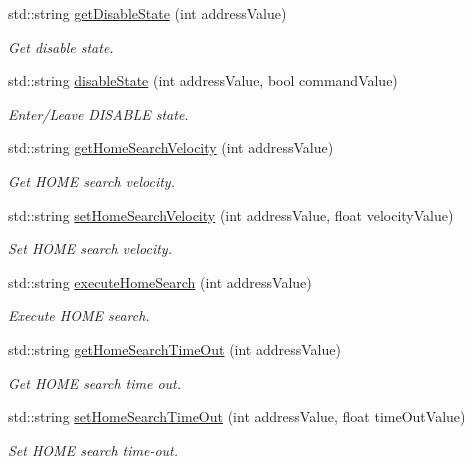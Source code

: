 \begin{DoxyCompactItemize}
std\+::string \hyperlink{namespaceconex_aa030f5f6f8e7d9de0c53bc783fd3b40a}{get\+Disable\+State} (int address\+Value)
\begin{DoxyCompactList}\small\item\em Get disable state. \end{DoxyCompactList}\item 
std\+::string \hyperlink{namespaceconex_a379241e6a2dafd2c5378ff9029a2afbb}{disable\+State} (int address\+Value, bool command\+Value)
\begin{DoxyCompactList}\small\item\em Enter/\+Leave D\+I\+S\+A\+B\+LE state. \end{DoxyCompactList}\item 
std\+::string \hyperlink{namespaceconex_a9bf3d6adb4fd4d48f95b2c27169ef773}{get\+Home\+Search\+Velocity} (int address\+Value)
\begin{DoxyCompactList}\small\item\em Get H\+O\+ME search velocity. \end{DoxyCompactList}\item 
std\+::string \hyperlink{namespaceconex_ae0d284374b70f666fa8cad9bb3c81aa4}{set\+Home\+Search\+Velocity} (int address\+Value, float velocity\+Value)
\begin{DoxyCompactList}\small\item\em Set H\+O\+ME search velocity. \end{DoxyCompactList}\item 
std\+::string \hyperlink{namespaceconex_a31e52a12a8f66df0c10a49931f7fce47}{execute\+Home\+Search} (int address\+Value)
\begin{DoxyCompactList}\small\item\em Execute H\+O\+ME search. \end{DoxyCompactList}\item 
std\+::string \hyperlink{namespaceconex_a5652c22cdfb236799111449461eb88f5}{get\+Home\+Search\+Time\+Out} (int address\+Value)
\begin{DoxyCompactList}\small\item\em Get H\+O\+ME search time out. \end{DoxyCompactList}\item 
std\+::string \hyperlink{namespaceconex_a55f14dbf89cbe71b6d0934eef1a97d1b}{set\+Home\+Search\+Time\+Out} (int address\+Value, float time\+Out\+Value)
\begin{DoxyCompactList}\small\item\em Set H\+O\+ME search time-\/out. \end{DoxyCompactList}\item 

\end{DoxyCompactItemize}
